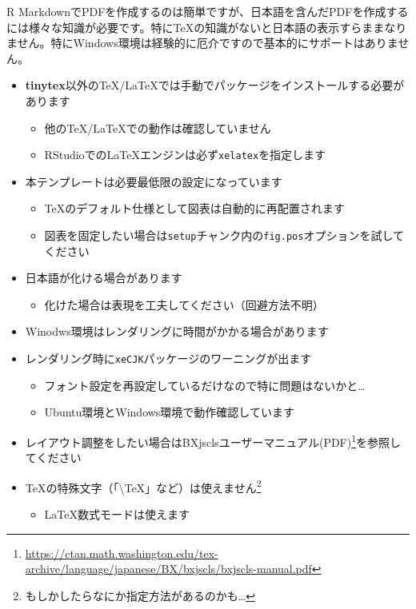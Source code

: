 \documentclass[
  12pt,
  a4paper,xelatex,ja=standard]{bxjsslide}
\DeclareRobustCommand{\href}[2]{#2\footnote{\url{#1}}}
\providecommand{\tightlist}{%
  \setlength{\itemsep}{0pt}\setlength{\parskip}{0pt}}
\begin{document}
R
MarkdownでPDFを作成するのは簡単ですが、日本語を含んだPDFを作成するには様々な知識が必要です。特にTeXの知識がないと日本語の表示すらままなりません。特にWindows環境は経験的に厄介ですので基本的にサポートはありません。

\begin{itemize}
\tightlist
\item
  \textbf{tinytex}以外のTeX/LaTeXでは手動でパッケージをインストールする必要があります

  \begin{itemize}
  \tightlist
  \item
    他のTeX/LaTeXでの動作は確認していません
  \item
    RStudioでのLaTeXエンジンは必ず\texttt{xelatex}を指定します
  \end{itemize}
\item
  本テンプレートは必要最低限の設定になっています

  \begin{itemize}
  \tightlist
  \item
    TeXのデフォルト仕様として図表は自動的に再配置されます
  \item
    図表を固定したい場合は\texttt{setup}チャンク内の\texttt{fig.pos}オプションを試してください
  \end{itemize}
\item
  日本語が化ける場合があります

  \begin{itemize}
  \tightlist
  \item
    化けた場合は表現を工夫してください（回避方法不明）
  \end{itemize}
\item
  Winodws環境はレンダリングに時間がかかる場合があります
\item
  レンダリング時に\texttt{xeCJK}パッケージのワーニングが出ます

  \begin{itemize}
  \tightlist
  \item
    フォント設定を再設定しているだけなので特に問題はないかと\ldots{}
  \item
    Ubuntu環境とWindows環境で動作確認しています
  \end{itemize}
\item
  レイアウト調整をしたい場合は\href{https://ctan.math.washington.edu/tex-archive/language/japanese/BX/bxjscls/bxjscls-manual.pdf}{BXjsclsユーザーマニュアル(PDF)}を参照してください
\item
  TeXの特殊文字（「\textbackslash TeX」など）は使えません\footnote{もしかしたらなにか指定方法があるのかも\ldots{}}

  \begin{itemize}
  \tightlist
  \item
    LaTeX数式モードは使えます
  \end{itemize}
\end{itemize}
\end{document}

